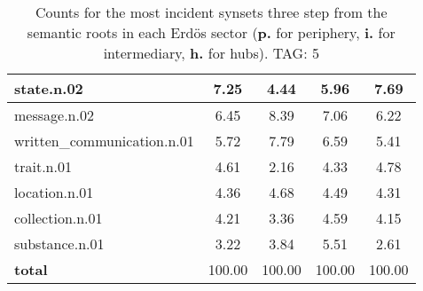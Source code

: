\begin{table}[h!]
\begin{center}
\begin{tabular}{| l || c | c | c | c |}
state.n.02 & 7.25  & 4.44  & 5.96  & 7.69 \\\hline
message.n.02 & 6.45  & 8.39  & 7.06  & 6.22 \\\hline
written\_communication.n.01 & 5.72  & 7.79  & 6.59  & 5.41 \\\hline
trait.n.01 & 4.61  & 2.16  & 4.33  & 4.78 \\\hline
location.n.01 & 4.36  & 4.68  & 4.49  & 4.31 \\\hline
collection.n.01 & 4.21  & 3.36  & 4.59  & 4.15 \\\hline
substance.n.01 & 3.22  & 3.84  & 5.51  & 2.61 \\\hline\hline
{{\bf total}} & 100.00  & 100.00  & 100.00  & 100.00 \\\hline
\end{tabular}
\caption{Counts for the most incident synsets three step from the semantic roots in each Erd\"os sector ({\bf p.} for periphery, {\bf i.} for intermediary, {\bf h.} for hubs). TAG: 5}
\end{center}
\end{table}